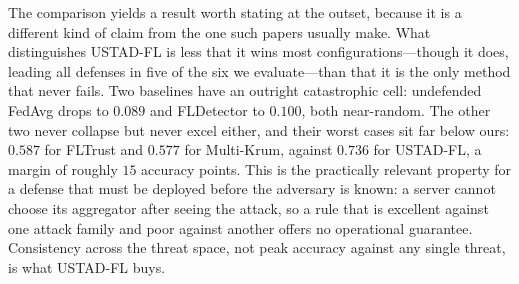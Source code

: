 \documentclass[journal]{IEEEtran}
\begin{document}
The comparison yields a result worth stating at the outset, because it is a different kind of claim from the one such papers usually make. What distinguishes USTAD-FL is less that it wins most configurations---though it does, leading all defenses in five of the six we evaluate---than that it is the only method that never fails. Two baselines have an outright catastrophic cell: undefended FedAvg drops to $0.089$ and FLDetector to $0.100$, both near-random. The other two never collapse but never excel either, and their worst cases sit far below ours: $0.587$ for FLTrust and $0.577$ for Multi-Krum, against $0.736$ for USTAD-FL, a margin of roughly $15$ accuracy points. This is the practically relevant property for a defense that must be deployed before the adversary is known: a server cannot choose its aggregator after seeing the attack, so a rule that is excellent against one attack family and poor against another offers no operational guarantee. Consistency across the threat space, not peak accuracy against any single threat, is what USTAD-FL buys.
\end{document}
